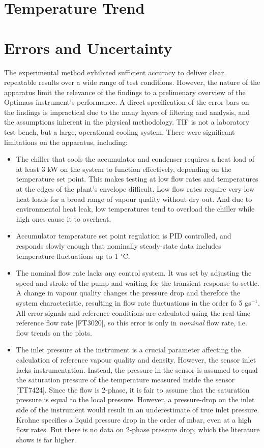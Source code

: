 \documentclass{report}
\begin{document}
\section{Temperature Trend}
\section{Errors and Uncertainty}
The experimental method exhibited sufficient accuracy to deliver clear, repeatable results over a wide range of test conditions. However, the nature of the apparatus limit the relevance of the findings to a prelimenary overview of the Optimass instrument's performance. A direct specification of the error bars on the findings is impractical due to the many layers of filtering and analysis, and the assumptions inherent in the physical methodology. TIF is not a laboratory test bench, but a large, operational cooling system. There were significant limitations on the apparatus, including:
\begin{itemize}
\item{The chiller that cools the accumulator and condenser requires a heat load of at least 3 kW on the system to function effectively, depending on the temperature set point. This makes testing at low flow rates and temperatures at the edges of the plant's envelope difficult. Low flow rates require very low heat loads for a broad range of vapour quality without dry out. And due to environmental heat leak, low temperatures tend to overload the chiller while high ones cause it to overheat.}
\item{Accumulator temperature set point regulation is PID controlled, and responds slowly enough that nominally steady-state data includes temperature fluctuations up to 1 $^\circ$C.}
\item{The nominal flow rate lacks any control system. It was set by adjusting the speed and stroke of the pump and waiting for the transient response to settle. A change in vapour quality changes the pressure drop and therefore the system characteristic, resulting in flow rate fluctuations in the order fo 5 gs$^{-1}$. All error signals and reference conditions are calculated using the real-time reference flow rate [FT3020], so this error is only in \textit{nominal} flow rate, i.e. flow trends on the plots.}
\item{The inlet pressure at the instrument is a crucial parameter affecting the calculation of reference vapour quality and density. However, the sensor inlet lacks instrumentation. Instead, the pressure in the sensor is assumed to equal the saturation pressure of the temperature measured inside the sensor [TT7424]. Since the flow is 2-phase, it is fair to assume that the saturation pressure is equal to the local pressure. However, a pressure-drop on the inlet side of the instrument would result in an underestimate of true inlet pressure. Krohne specifies a liquid pressure drop in the order of mbar, even at a high flow rates. But there is no data on 2-phase pressure drop, which the literature shows is far higher.}
\end{itemize}
\end{document}
